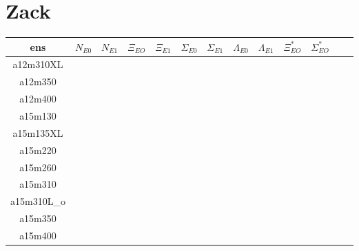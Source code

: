 \documentclass{article}
\begin{document}
\section*{Zack}
\begin{table}[h!]
  \centering
 \setlength{\arrayrulewidth}{0.5mm}
\setlength{\tabcolsep}{13pt}
\renewcommand{\arraystretch}{2}
 \begin{tabular}{|| c |c | c | c | c | c | c | c | c | c | c | c | c ||} 
 \hline
 ens & $N_{E0}$ & $N_{E1}$ & $\Xi_{EO}$ &  $\Xi_{E1}$ & $\Sigma_{E0}$ & $\Sigma_{E1}$ & $\Lambda_{E0}$ & $\Lambda_{E1}$ &  $\Xi^*_{EO}$ &  $\Sigma^*_{EO}$ \\ [0.8ex] 
 \hline\hline
 a12m310XL
 & {}   &   {} & {}   & {}   & {}  & {}   & {}  & {}  & {}  & {}  &  \\ 
 \hline
 a12m350 
 & {}   &   {} & {}   & {}   & {}  & {}   & {}  & {}  & {}  & {}  &  \\
 \hline
 a12m400 
  & {}   &   {} & {}   & {}   & {}  & {}   & {}  & {}  & {}  & {}  &  \\
 \hline
 a15m130  
  & {}   &   {} & {}   & {}   & {}  & {}   & {}  & {}  & {}  & {}  &  \\
 \hline
 a15m135XL 
 & {}   &   {} & {}   & {}   & {}  & {}   & {}  & {}  & {}  & {}  &  \\
 \hline
 a15m220
  & {}   &   {} & {}   & {}   & {}  & {}   & {}  & {}  & {}  & {}  &  \\
 \hline
 a15m260
  & {}   &   {} & {}   & {}   & {}  & {}   & {}  & {}  & {}  & {}  &  \\
 \hline
 a15m310
  & {}   &   {} & {}   & {}   & {}  & {}   & {}  & {}  & {}  & {}  &  \\
 \hline
 a15m310L_o 
  & {}   &   {} & {}   & {}   & {}  & {}   & {}  & {}  & {}  & {}  &  \\
 \hline
 a15m350 
  & {}   &   {} & {}   & {}   & {}  & {}   & {}  & {}  & {}  & {}  &  \\
 \hline
a15m400
 & {}   &   {} & {}   & {}   & {}  & {}   & {}  & {}  & {}  & {}  &  \\
 \hline
 
 \end{tabular}
\end{table}
\newpage
\end{document}
